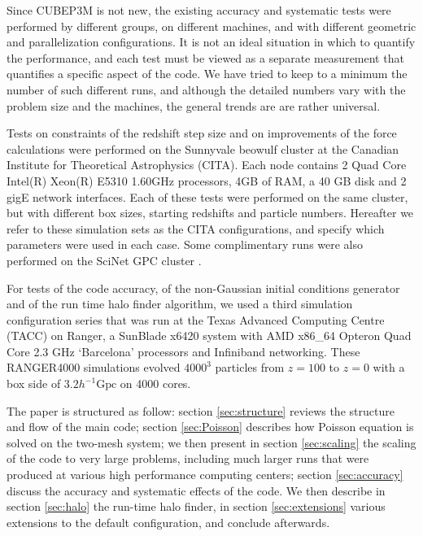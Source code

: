 Since {\small CUBEP3M} is not new, the existing  accuracy and systematic tests were performed by different groups, on different machines,
and with different geometric and parallelization configurations. It is not an ideal situation in which to quantify the performance, and each test must be viewed as a
separate measurement that quantifies a specific aspect of the code. 
We have tried to keep to a minimum the number of such different runs, and although the detailed numbers vary 
with the problem size and the machines, the general trends are are rather universal.

Tests on constraints of the redshift step size and on improvements of the force calculations were performed 
on the Sunnyvale beowulf cluster at the Canadian Institute for Theoretical Astrophysics (CITA).
Each node contains 2 Quad Core Intel(R) Xeon(R) E5310 1.60GHz processors, 4GB of RAM,  a 40 GB disk and 2 gigE network interfaces. 
Each of these tests were performed on the same cluster, but with  different box sizes, starting redshifts and particle numbers.
Hereafter we refer to these simulation sets as the CITA configurations, and specify which parameters were used in each case.
Some complimentary runs were also performed on the SciNet GPC cluster \citep{Scinet}.

For tests of the code accuracy, of the non-Gaussian initial conditions generator and of the run time halo finder algorithm, 
we used a third simulation configuration series that was run at the Texas Advanced Computing Centre (TACC) on Ranger, a SunBlade 
x6420 system with AMD x86\_64 Opteron Quad Core 2.3 GHz `Barcelona' processors and Infiniband networking.
These RANGER4000 simulations evolved $4000^{3}$ particles 
from $z=100$ to $z=0$ with a box side of $3.2 h^{-1}\mbox{Gpc}$
on 4000 cores.
 

The paper is structured as follow: section \ref{sec:structure} reviews the structure and flow of the main code;
section \ref{sec:Poisson} describes how Poisson equation is solved on the two-mesh system;
we then present in section \ref{sec:scaling} the scaling of the code to very large problems,
including much larger runs that were produced at various high performance computing centers;
section \ref{sec:accuracy}  discuss the accuracy and systematic effects of the code.
 We then describe in section \ref{sec:halo} the run-time halo finder, in section \ref{sec:extensions} various extensions
 to the default configuration, and conclude afterwards.




